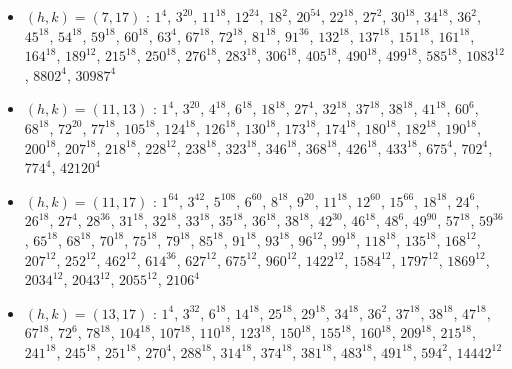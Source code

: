 \begin{itemize}
\item $(h,k)=(7,17)$ : $1^{4}$, $3^{20}$, $11^{18}$, $12^{24}$, $18^{2}$, $20^{54}$, $22^{18}$, $27^{2}$, $30^{18}$, $34^{18}$, $36^{2}$, $45^{18}$, $54^{18}$, $59^{18}$, $60^{18}$, $63^{4}$, $67^{18}$, $72^{18}$, $81^{18}$, $91^{36}$, $132^{18}$, $137^{18}$, $151^{18}$, $161^{18}$, $164^{18}$, $189^{12}$, $215^{18}$, $250^{18}$, $276^{18}$, $283^{18}$, $306^{18}$, $405^{18}$, $490^{18}$, $499^{18}$, $585^{18}$, $1083^{12}$, $8802^{4}$, $30987^{4}$
\item $(h,k)=(11,13)$ : $1^{4}$, $3^{20}$, $4^{18}$, $6^{18}$, $18^{18}$, $27^{4}$, $32^{18}$, $37^{18}$, $38^{18}$, $41^{18}$, $60^{6}$, $68^{18}$, $72^{20}$, $77^{18}$, $105^{18}$, $124^{18}$, $126^{18}$, $130^{18}$, $173^{18}$, $174^{18}$, $180^{18}$, $182^{18}$, $190^{18}$, $200^{18}$, $207^{18}$, $218^{18}$, $228^{12}$, $238^{18}$, $323^{18}$, $346^{18}$, $368^{18}$, $426^{18}$, $433^{18}$, $675^{4}$, $702^{4}$, $774^{4}$, $42120^{4}$
\item $(h,k)=(11,17)$ : $1^{64}$, $3^{42}$, $5^{108}$, $6^{60}$, $8^{18}$, $9^{20}$, $11^{18}$, $12^{60}$, $15^{66}$, $18^{18}$, $24^{6}$, $26^{18}$, $27^{4}$, $28^{36}$, $31^{18}$, $32^{18}$, $33^{18}$, $35^{18}$, $36^{18}$, $38^{18}$, $42^{30}$, $46^{18}$, $48^{6}$, $49^{90}$, $57^{18}$, $59^{36}$, $65^{18}$, $68^{18}$, $70^{18}$, $75^{18}$, $79^{18}$, $85^{18}$, $91^{18}$, $93^{18}$, $96^{12}$, $99^{18}$, $118^{18}$, $135^{18}$, $168^{12}$, $207^{12}$, $252^{12}$, $462^{12}$, $614^{36}$, $627^{12}$, $675^{12}$, $960^{12}$, $1422^{12}$, $1584^{12}$, $1797^{12}$, $1869^{12}$, $2034^{12}$, $2043^{12}$, $2055^{12}$, $2106^{4}$
\item $(h,k)=(13,17)$ : $1^{4}$, $3^{32}$, $6^{18}$, $14^{18}$, $25^{18}$, $29^{18}$, $34^{18}$, $36^{2}$, $37^{18}$, $38^{18}$, $47^{18}$, $67^{18}$, $72^{6}$, $78^{18}$, $104^{18}$, $107^{18}$, $110^{18}$, $123^{18}$, $150^{18}$, $155^{18}$, $160^{18}$, $209^{18}$, $215^{18}$, $241^{18}$, $245^{18}$, $251^{18}$, $270^{4}$, $288^{18}$, $314^{18}$, $374^{18}$, $381^{18}$, $483^{18}$, $491^{18}$, $594^{2}$, $14442^{12}$
\end{itemize}
